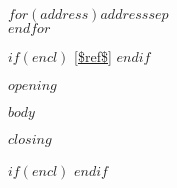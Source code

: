 \documentclass[11pt]{lettre}
\makeatletter
\newcommand*{\NoRule}{\renewcommand*{\rule@length}{0}}
\makeatother
\begin{document}
%
\begin{letter}{
$for(address)$$address$$sep$\\$endfor$}
\date{$date$} 
\NoRule
\vspace{-100px}
%

$if(encl)$
\vref{$ref$} 
$endif$

\opening{$opening$}

$body$
\closing{$closing$}

$if(encl)$
$endif$


\end{letter}
\end{document}
